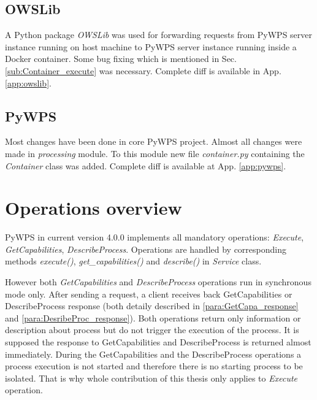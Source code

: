 \subsection{OWSLib}
\label{sub:owslib}
A Python package \textit{OWSLib} was used for forwarding requests from
PyWPS server instance running on host machine to PyWPS server instance
running inside a Docker container. Some bug fixing which is
mentioned in Sec.\ref{sub:Container_execute} was necessary. Complete
diff is available in App. \ref{app:owslib}.

\subsection{PyWPS}
Most changes have been done in core PyWPS project. Almost all changes were made in \textit{processing} module. To this module new file
\textit{container.py} containing the \textit{Container} class was added. Complete diff is available at App. \ref{app:pywps}.

\newpage
\section{Operations overview}
\label{sec:operations_ov}
PyWPS in current version 4.0.0 implements all mandatory operations: \textit{Execute}, \textit{GetCapabilities}, \textit{DescribeProcess}.
Operations are handled by corresponding methods \textit{execute()}, \textit{get\_capabilities()} and \textit{describe()} in \textit{Service} class. 

However both \textit{GetCapabilities} and \textit{DescribeProcess}
operations run in synchronous mode only. After sending a request, a
client receives back GetCapabilities or DescribeProcess response (both
detaily described in \ref{para:GetCapa_response} and
\ref{para:DesribeProc_response}). Both operations return only
information or description about process but do not trigger the
execution of the process. It is supposed the response to
GetCapabilities and DescribeProcess is returned almost immediately.
During the GetCapabilities and the DescribeProcess operations a
process execution is not started and therefore there is no starting
process to be isolated. That is why whole contribution of this thesis
only applies to \textit{Execute} operation.

